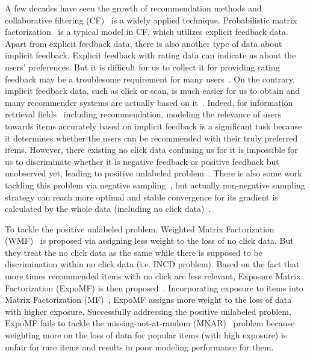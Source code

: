 \documentclass[sigconf]{acmart}
\begin{document}
A few decades have seen the growth of recommendation methods and collaborative filtering (CF)~\cite{Goldberg-CF-92} is a widely applied technique. Probabilistic matrix factorization~\cite{NIPS2007-PMF} is a typical model in CF, which utilizes explicit feedback data. Apart from explicit feedback data, there is also another type of data about implicit feedback. Explicit feedback with rating data can indicate us about the users' preferences. But it is difficult for us to collect it for providing rating feedback may be a troublesome requirement for many users~\cite{jannach2018recommending}. On the contrary, implicit feedback data, such as click or scan, is much easier for us to obtain and many recommender systems are actually based on it~\cite{liu2010personalized, chen2020efficient}. Indeed, for information retrieval fields~\cite{joachims2016counterfactual, joachims2017unbiased, wang2018position} including recommendation, modeling the relevance of users towards items accurately based on implicit feedback is a significant task because it determines whether the users can be recommended with their truly preferred items. However, there existing no click data confusing us for it is impossible for us to discriminate whether it is negative feedback or positive feedback but unobserved yet, leading to positive unlabeled problem~\cite{elkan2008learning, bekker2019beyond}. There is also some work tackling this problem via negative sampling~\cite{xu2016tag}, but actually non-negative sampling strategy can reach more optimal and stable convergence for its gradient is calculated by the whole data (including no click data)~\cite{chen2019efficient, hu2008collaborative}.

To tackle the positive unlabeled problem, Weighted Matrix Factorization (WMF)~\cite{hu2008collaborative} is proposed via assigning less weight to the loss of no click data. But they treat the no click data as the same while there is supposed to be discrimination within no click data (i.e. INCD problem). Based on the fact that more times recommended items with no click are less relevant, Exposure Matrix Factorization (ExpoMF) is then proposed~\cite{liang2016modeling}. Incorporating exposure to items into Matrix Factorization (MF)~\cite{NIPS2007-PMF}, ExpoMF assigns more weight to the loss of data with higher exposure. Successfully addressing the positive unlabeled problem, ExpoMF fails to tackle the missing-not-at-random (MNAR)~\cite{schnabel2016recommendations, yang2018unbiased} problem because weighting more on the loss of data for popular items (with high exposure) is unfair for rare items and results in poor modeling performance for them. 
\end{document}
